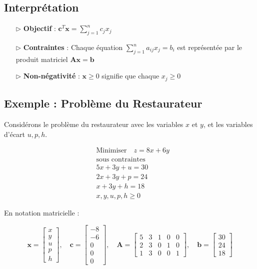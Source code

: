 \documentclass{report}
\begin{document}
\begin{multicols*}{2}
\subsection*{Interprétation}

\begin{itemize}
    \item[$\rhd$] \textbf{Objectif} : \(\mathbf{c}^T \mathbf{x} = \sum_{j=1}^{n} c_j x_j\)
    \item[$\rhd$] \textbf{Contraintes} : Chaque équation \( \sum_{j=1}^{n} a_{ij} x_j = b_i \) est représentée par le produit matriciel \( \mathbf{A} \mathbf{x} = \mathbf{b} \)
    \item[$\rhd$] \textbf{Non-négativité} : \( \mathbf{x} \geq 0 \) signifie que chaque \( x_j \geq 0 \)
\end{itemize}

\subsection*{Exemple : Problème du Restaurateur}

Considérons le problème du restaurateur avec les variables \( x \) et \( y \), et les variables d'écart \( u, p, h \).

\begin{align*}
& \text{Minimiser} \quad z = 8x + 6y \\
& \text{sous contraintes} \\
& 5x + 3y + u = 30 \\
& 2x + 3y + p = 24 \\
& x + 3y + h = 18 \\
& x, y, u, p, h \geq 0
\end{align*}

En notation matricielle :

\[
\mathbf{x} = 
\begin{bmatrix}
x \\ y \\ u \\ p \\ h
\end{bmatrix}, \quad
\mathbf{c} = 
\begin{bmatrix}
-8 \\ -6 \\ 0 \\ 0 \\ 0
\end{bmatrix}, \quad
\mathbf{A} = 
\begin{bmatrix}
5 & 3 & 1 & 0 & 0 \\
2 & 3 & 0 & 1 & 0 \\
1 & 3 & 0 & 0 & 1
\end{bmatrix}, \quad
\mathbf{b} = 
\begin{bmatrix}
30 \\ 24 \\ 18
\end{bmatrix}
\]


\end{multicols*}
\end{document}
